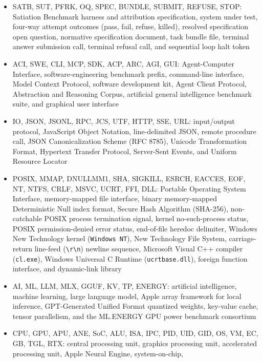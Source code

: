 \documentclass[10pt,letterpaper]{article}
\providecommand{\tightlist}{\setlength{\itemsep}{1pt}\setlength{\parskip}{0pt}}
\begin{document}
\begin{itemize}
\tightlist
\item
  SATB, SUT, PFRK, OQ, SPEC, BUNDLE, SUBMIT, REFUSE, STOP: Satiation
  Benchmark harness and attribution specification, system under test,
  four-way attempt outcomes (pass, fail, refuse, killed), resolved
  specification open question, normative specification document, task
  bundle file, terminal answer submission call, terminal refusal call,
  and sequential loop halt token
\item
  ACI, SWE, CLI, MCP, SDK, ACP, ARC, AGI, GUI: Agent-Computer Interface,
  software-engineering benchmark prefix, command-line interface, Model
  Context Protocol, software development kit, Agent Client Protocol,
  Abstraction and Reasoning Corpus, artificial general intelligence
  benchmark suite, and graphical user interface
\item
  IO, JSON, JSONL, RPC, JCS, UTF, HTTP, SSE, URL: input/output protocol,
  JavaScript Object Notation, line-delimited JSON, remote procedure
  call, JSON Canonicalization Scheme (RFC 8785), Unicode Transformation
  Format, Hypertext Transfer Protocol, Server-Sent Events, and Uniform
  Resource Locator
\item
  POSIX, MMAP, DNULLMM1, SHA, SIGKILL, ESRCH, EACCES, EOF, NT, NTFS,
  CRLF, MSVC, UCRT, FFI, DLL: Portable Operating System Interface,
  memory-mapped file interface, binary memory-mapped Deterministic Null
  index format, Secure Hash Algorithm (SHA-256), non-catchable POSIX
  process termination signal, kernel no-such-process status, POSIX
  permission-denied error status, end-of-file heredoc delimiter, Windows
  New Technology kernel (\texttt{Windows\ NT}), New Technology File
  System, carriage-return line-feed
  (\texttt{\textbackslash{}r\textbackslash{}n}) newline sequence,
  Microsoft Visual C++ compiler (\texttt{cl.exe}), Windows Universal C
  Runtime (\texttt{ucrtbase.\allowbreak{}dll}), foreign function interface, and
  dynamic-link library
\item
  AI, ML, LLM, MLX, GGUF, KV, TP, ENERGY: artificial intelligence,
  machine learning, large language model, Apple array framework for
  local inference, GPT-Generated Unified Format quantized weights,
  key-value cache, tensor parallelism, and the ML.ENERGY GPU power
  benchmark consortium
\item
  CPU, GPU, APU, ANE, SoC, ALU, ISA, IPC, PID, UID, GID, OS, VM, EC, GB,
  TGL, RTX: central processing unit, graphics processing unit,
  accelerated processing unit, Apple Neural Engine, system-on-chip,

\end{itemize}
\end{document}
